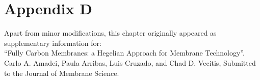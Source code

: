 \chapter{Appendix D}
\thispagestyle{plain}
\vspace{-.5cm}

\noindent Apart from minor modifications, this chapter originally appeared as supplementary information for:\newline\\
\ssp ``Fully Carbon Membranes: a Hegelian Approach for Membrane Technology''.
Carlo A. Amadei, Paula Arribas, Luis Cruzado, and Chad D. Vecitis, Submitted to the Journal of Membrane Science.

    \dsp

